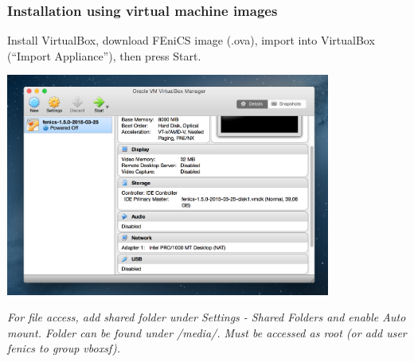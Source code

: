 \begin{frame}[fragile]
  \frametitle{Installation using virtual machine images}

  Install VirtualBox, download FEniCS image (.ova), import into VirtualBox (``Import Appliance''), then press Start.

  \begin{center}
    \includegraphics[width=0.8\textwidth]{png/installation_virtualbox.png}
  \end{center}

  \tiny\it
  For file access, add shared folder under Settings - Shared Folders and
  enable Auto mount. Folder can be found under /media/. Must be
  accessed as root (or add user fenics to group vboxsf).
  \rm\normalsize

\end{frame}